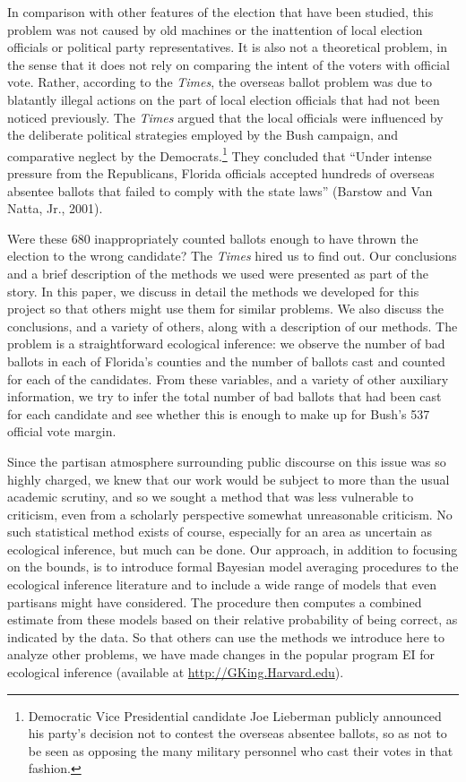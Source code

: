 \documentclass[11pt,titlepage]{article}
\begin{document}
In comparison with other features of the election that have been
studied, this problem was not caused by old machines or the
inattention of local election officials or political party
representatives.  It is also not a theoretical problem, in the sense
that it does not rely on comparing the intent of the voters with
official vote.  Rather, according to the \emph{Times}, the overseas
ballot problem was due to blatantly illegal actions on the part of
local election officials that had not been noticed previously.  The
\emph{Times} argued that the local officials were influenced by the
deliberate political strategies employed by the Bush campaign, and
comparative neglect by the Democrats.\footnote{Democratic Vice
  Presidential candidate Joe Lieberman publicly announced his party's
  decision not to contest the overseas absentee ballots, so as not to
  be seen as opposing the many military personnel who cast their votes
  in that fashion.}  They concluded that ``Under intense pressure from
the Republicans, Florida officials accepted hundreds of overseas
absentee ballots that failed to comply with the state laws'' (Barstow
and Van Natta, Jr., 2001)\nocite{BarVan01}.

Were these 680 inappropriately counted ballots enough to have thrown
the election to the wrong candidate?  The \emph{Times} hired us to
find out.  Our conclusions and a brief description of the methods we
used were presented as part of the story.  In this paper, we discuss
in detail the methods we developed for this project so that others
might use them for similar problems.  We also discuss the conclusions,
and a variety of others, along with a description of our methods.  The
problem is a straightforward ecological inference: we observe the
number of bad ballots in each of Florida's counties and the number of
ballots cast and counted for each of the candidates.  From these
variables, and a variety of other auxiliary information, we try to
infer the total number of bad ballots that had been cast for each
candidate and see whether this is enough to make up for Bush's 537
official vote margin.

Since the partisan atmosphere surrounding public discourse on this
issue was so highly charged, we knew that our work would be subject to
more than the usual academic scrutiny, and so we sought a method that
was less vulnerable to criticism, even from a scholarly perspective
somewhat unreasonable criticism.  No such statistical method exists of
course, especially for an area as uncertain as ecological inference,
but much can be done.  Our approach, in addition to focusing on the
bounds, is to introduce formal Bayesian model averaging procedures to
the ecological inference literature and to include a wide range of
models that even partisans might have considered.  The procedure then
computes a combined estimate from these models based on their relative
probability of being correct, as indicated by the data.  So that
others can use the methods we introduce here to analyze other
problems, we have made changes in the popular program EI for
ecological inference (available at \url{http://GKing.Harvard.edu}).
\end{document}
